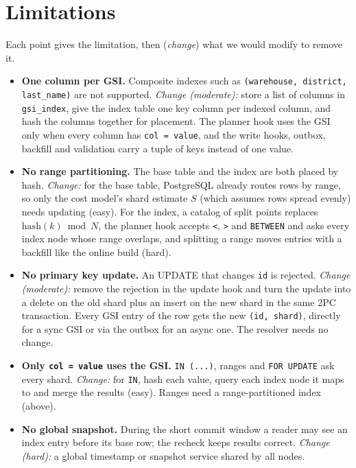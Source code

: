 \documentclass[11pt,a4paper]{article}
\begin{document}
\section*{Limitations}
Each point gives the limitation, then (\emph{change}) what we would modify to remove it.
\begin{itemize}
  \item \textbf{One column per GSI.} Composite indexes such as \texttt{(warehouse, district, last\_name)}
        are not supported. \emph{Change (moderate):} store a list of columns in \texttt{gsi\_index}, give
        the index table one key column per indexed column, and hash the columns together for placement.
        The planner hook uses the GSI only when every column has \texttt{col = value}, and the write
        hooks, outbox, backfill and validation carry a tuple of keys instead of one value.
  \item \textbf{No range partitioning.} The base table and the index are both placed by hash.
        \emph{Change:} for the base table, PostgreSQL already routes rows by range, so only the cost
        model's shard estimate $S$ (which assumes rows spread evenly) needs updating (easy). For the index,
        a catalog of split points replaces $\mathrm{hash}(k) \bmod N$, the planner hook accepts
        \texttt{<}, \texttt{>} and \texttt{BETWEEN} and asks every index node whose range overlaps, and
        splitting a range moves entries with a backfill like the online build (hard).
  \item \textbf{No primary key update.} An UPDATE that changes \texttt{id} is rejected.
        \emph{Change (moderate):} remove the rejection in the update hook and turn the update into a
        delete on the old shard plus an insert on the new shard in the same 2PC transaction. Every GSI
        entry of the row gets the new \texttt{(id, shard)}, directly for a sync GSI or via the outbox for
        an async one. The resolver needs no change.
  \item \textbf{Only \texttt{col = value} uses the GSI.} \texttt{IN (...)}, ranges and \texttt{FOR UPDATE}
        ask every shard. \emph{Change:} for \texttt{IN}, hash each value, query each index node it maps
        to and merge the results (easy). Ranges need a range-partitioned index (above).
  \item \textbf{No global snapshot.} During the short commit window a reader may see an index entry
        before its base row; the recheck keeps results correct. \emph{Change (hard):} a global
        timestamp or snapshot service shared by all nodes.

\end{itemize}
\end{document}
